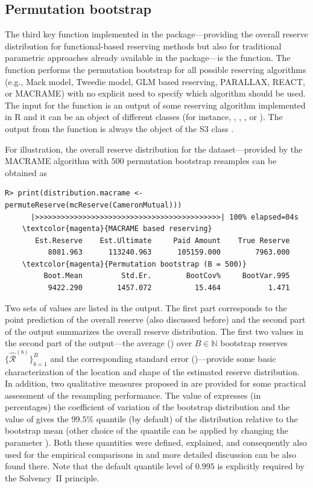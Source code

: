 \subsection{Permutation bootstrap}
The third key function implemented in the  package---providing the overall reserve distribution for functional-based reserving methods but also for traditional parametric approaches already available in the  package---is the  function. The function performs the permutation bootstrap for all possible reserving algorithms (e.g., Mack model, Tweedie model, GLM based reserving, PARALLAX, REACT, or MACRAME) with no explicit need to specify which algorithm should be used. The input for the  function is an output of some reserving algorithm implemented in R and it can be an object of different classes (for instance, , , , or ). The output from the  function is always the object of the S3 class . 

 For illustration, the overall reserve distribution for the  dataset---provided by the MACRAME algorithm with $500$ permutation bootstrap resamples can be obtained as
\begin{Verbatim}[commandchars=\\\{\}]
    R> print(distribution.macrame <- permuteReserve(mcReserve(CameronMutual)))
      |>>>>>>>>>>>>>>>>>>>>>>>>>>>>>>>>>>>>>>>>>>>| 100% elapsed=04s
    \textcolor{magenta}{MACRAME based reserving}
       Est.Reserve    Est.Ultimate     Paid Amount    True Reserve 
          8081.963      113240.963      105159.000        7963.000 
    \textcolor{magenta}{Permutation bootstrap (B = 500)}
         Boot.Mean         Std.Er.        BootCov%     BootVar.995 
          9422.290        1457.072          15.464           1.471 
\end{Verbatim}
Two sets of values are listed in the output. The first part corresponds to the point prediction of the overall reserve (also discussed before) and the second part of the output summarizes the overall reserve distribution. The first two values in the second part of the output---the average () over $B \in \mathbb{N}$ bootstrap  reserves $\{\widehat{\mathcal{R}}^{(b)}\}_{b = 1}^B$  and the corresponding standard error ()---provide some basic characterization of the location and shape of the estimated reserve distribution. In addition, two qualitative measures proposed in \cite{MMP2022} are provided for some practical assessment of the resampling performance. The value of  expresses (in percentages) the coefficient of variation of the bootstrap distribution and the value of  gives the $99.5\%$ quantile (by default) of the  distribution relative to the bootstrap mean (other choice of the quantile can be applied by changing the parameter ). Both these quantities were defined, explained, and consequently also used for the empirical comparisons in \cite{MMP2022} and more detailed discussion can be also found there. Note that the default quantile level of $0.995$ is explicitly required by the Solvency~II principle.

